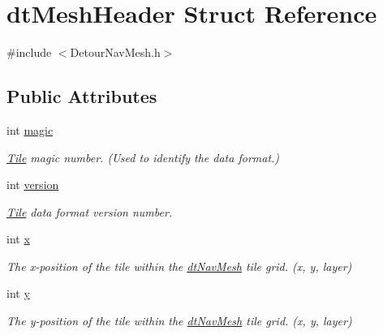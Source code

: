 \hypertarget{structdtMeshHeader}{}\section{dt\+Mesh\+Header Struct Reference}
\label{structdtMeshHeader}


{\ttfamily \#include $<$Detour\+Nav\+Mesh.\+h$>$}

\subsection*{Public Attributes}
\begin{DoxyCompactItemize}
\item 
\mbox{\label{structdtMeshHeader_a3e7a9662d94d08b62ca84d44e150facc}} 
int \hyperlink{structdtMeshHeader_a3e7a9662d94d08b62ca84d44e150facc}{magic}
\begin{DoxyCompactList}\small\item\em \hyperlink{structTile}{Tile} magic number. (Used to identify the data format.) \end{DoxyCompactList}\item 
\mbox{\label{structdtMeshHeader_a22f4453e3e449586b26d71d8153bfb02}} 
int \hyperlink{structdtMeshHeader_a22f4453e3e449586b26d71d8153bfb02}{version}
\begin{DoxyCompactList}\small\item\em \hyperlink{structTile}{Tile} data format version number. \end{DoxyCompactList}\item 
\mbox{\label{structdtMeshHeader_ae577ca0c9fba95254b699a51483e374c}} 
int \hyperlink{structdtMeshHeader_ae577ca0c9fba95254b699a51483e374c}{x}
\begin{DoxyCompactList}\small\item\em The x-\/position of the tile within the \hyperlink{classdtNavMesh}{dt\+Nav\+Mesh} tile grid. (x, y, layer) \end{DoxyCompactList}\item 
\mbox{\label{structdtMeshHeader_a9969f562faa5990fec5ff27c9d2b50b9}} 
int \hyperlink{structdtMeshHeader_a9969f562faa5990fec5ff27c9d2b50b9}{y}
\begin{DoxyCompactList}\small\item\em The y-\/position of the tile within the \hyperlink{classdtNavMesh}{dt\+Nav\+Mesh} tile grid. (x, y, layer) \end{DoxyCompactList}\item 

\end{DoxyCompactItemize}
